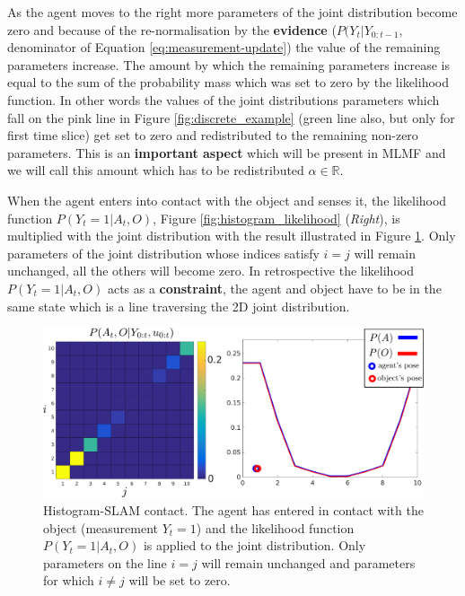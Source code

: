 As the agent moves to the right more parameters of the joint distribution become zero and because of the re-normalisation by the \textbf{evidence} ($P(Y_t|Y_{0:t-1}$, denominator of Equation \ref{eq:measurement-update}) the value of the remaining 
parameters increase. The amount by which the remaining parameters increase is equal to the sum of the probability mass which was set to zero by the likelihood function.
In other words the values of the joint distributions parameters which fall on the pink line in Figure \ref{fig:discrete_example} (green line also, but only for first time slice)
get set to zero and redistributed to the remaining non-zero parameters. This is an \textbf{important aspect} which will be present in MLMF and we will call this amount which has to be redistributed $\alpha \in \mathbb{R}$.

When the agent enters into contact with the object and senses it, the likelihood function $P(Y_t=1|A_t,O)$, Figure \ref{fig:histogram_likelihood} (\textit{Right}), is 
multiplied with the joint distribution with the result illustrated in Figure \ref{fig:discrete_example_contact}. Only parameters of the joint distribution whose indices
satisfy $i = j$ will remain unchanged, all the others will become zero. In retrospective the likelihood $P(Y_t=1|A_t,O)$ acts as a \textbf{constraint}, the agent and 
object have to be in the same state which is a line traversing the 2D joint distribution.

\begin{figure}
 \centering
 \includegraphics[width=\textwidth]{./ch5-MLMF/Figures/explenation/joint_marginal_contact.pdf}
 \caption{Histogram-SLAM contact. The agent has entered in contact with the object (measurement $Y_t = 1$) and the likelihood function $P(Y_t=1|A_t,O)$ is applied to the joint
 distribution. Only parameters on the line $i=j$ will remain unchanged and parameters for which $i \not= j$ will be set to zero.}
 \label{fig:discrete_example_contact}
\end{figure}


